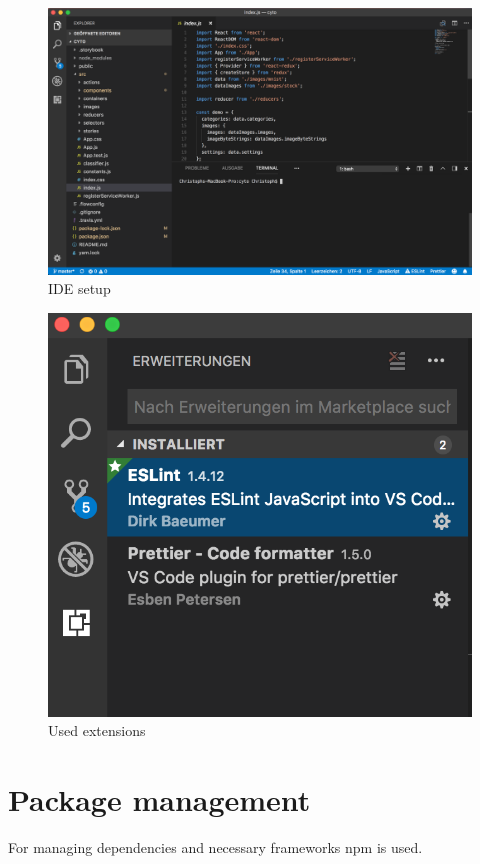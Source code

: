 \begin{figure}[H]
	\centering
	\includegraphics[width=\linewidth]{bilder/cyto/IDE.png}
	\caption{IDE setup}
	\label{fig:IDE}
\end{figure}

\begin{figure}[H]
	\centering
	\includegraphics[scale=0.5]{bilder/cyto/LINT.png}
	\caption{Used extensions}
	\label{fig:Extensions}
\end{figure}

\section{Package management}
For managing dependencies and necessary frameworks npm is used. 

